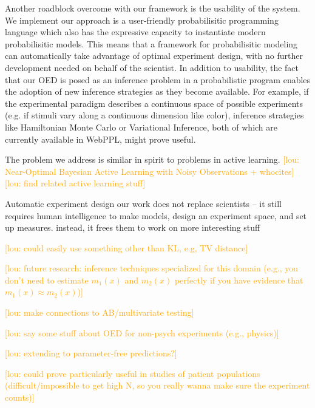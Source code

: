 \documentclass{article}
\newcommand{\lou}[1]{\textcolor{orange}{[lou: #1]}}
\newcommand{\cas}[1]{ \textsf{\color{darkgray} \scriptsize #1} }
\begin{document}
Another roadblock overcome with our framework is the usability of the system.
We implement our approach is a user-friendly probabilisitic programming language which also has the expressive capacity to instantiate modern probabilisitic models.
This means that a framework for probabilisitic modeling can automatically take advantage of optimal experiment design, with no further development needed on behalf of the scientist.
In addition to usability, the fact that our OED is posed as an inference problem in a probabilistic program enables the adoption of new inference strategies as they become available.
For example, if the experimental paradigm describes a continuous space of possible experiments (e.g. if stimuli vary along a continuous dimension like color), inference strategies like Hamiltonian Monte Carlo or Variational Inference, both of which are currently available in WebPPL, might prove useful.

The problem we address is similar in spirit to problems in active learning.
\lou{Near-Optimal Bayesian Active Learning with Noisy Observations + whocites}
\lou{find related active learning stuff}

Automatic experiment design
\cas{our work does not replace scientists -- it still requires human intelligence to make models, design an experiment space, and set up measures. instead, it frees them to work on more interesting stuff}

\lou{could easily use something other than KL, e.g, TV distance}

\lou{future research: inference techniques specialized for this domain (e.g., you don't need to estimate $m_1(x)$ and $m_2(x)$ perfectly if you have evidence that $m_1(x) \approx m_2(x)$)}

\lou{make connections to AB/multivariate testing}

\lou{say some stuff about OED for non-psych experiments (e.g., physics)}

\lou{extending to parameter-free predictions?}

\lou{could prove particularly useful in studies of patient populations (difficult/impossible to get high N, so you really wanna make sure the experiment counts)}



\end{document}
